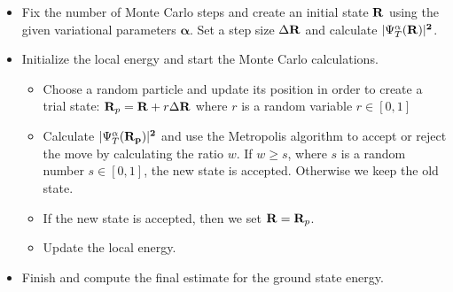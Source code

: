\documentclass[../main.tex]{subfiles}
\begin{document}
\begin{itemize}
 \item Fix the number of Monte Carlo steps and create an initial state            $\bf{R}$ using the given variational parameters
       $\boldsymbol{\alpha}$. Set a step size $\Delta {\bf R}$ and calculate $|\Psi_T^\alpha(\bf{R})|^2$.
 \item Initialize the local energy and start the Monte Carlo calculations.
 \begin{itemize}
     \item Choose a random particle and update its position in order to create a trial state: ${\bf R}_p = {\bf R} + r\Delta {\bf R}$ where $r$ is a random variable $r \in [0,1]$
     \item Calculate $|\Psi_T^\alpha(\bf{R}_p)|^2$ and use the Metropolis algorithm to accept or reject the move by calculating the ratio $w$. 
       If $w \geq s$, where $s$ is a random number $s \in [0,1]$, the new state is accepted. Otherwise we keep the old state.
     \item If the new state is accepted, then we set ${\bf R} = {\bf R}_p$.
     \item Update the local energy.
 \end{itemize}
 
 \item Finish and compute the final estimate for the ground state energy.
\end{itemize}
\end{document}
